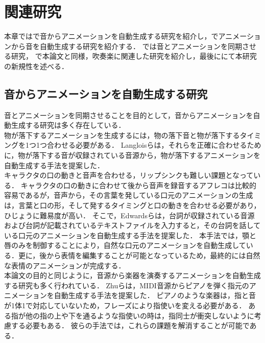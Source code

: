 \chapter{関連研究}
\label{chap:previousworks}
本章ではで音からアニメーションを自動生成する研究を紹介し，でアニメーションから音を自動生成する研究を紹介する．
では音とアニメーションを同期させる研究，
で本論文と同様，吹奏楽に関連した研究を紹介し，最後ににて本研究の新規性を述べる．

\section{音からアニメーションを自動生成する研究}\label{sec:generate_animation}
音とアニメーションを同期させることを目的として，音からアニメーションを自動生成する研究は多く存在している．\\
\indent
物が落下するアニメーションを生成するには，物の落下音と物が落下するタイミングを1つ1つ合わせる必要がある．
Langloisら\cite{IFA}は，それらを正確に合わせるために，物が落下する音が収録されている音源から，物が落下するアニメーションを自動生成する手法を提案した．\\
%
\indent
キャラクタの口の動きと音声を合わせる，リップシンクも難しい課題となっている．
キャラクタの口の動きに合わせて後から音声を録音するアフレコは比較的容易であるが，音声から，その言葉を発している口元のアニメーションの生成は，言葉と口の形，そして発するタイミングと口の動きを合わせる必要があり，ひじょうに難易度が高い．
そこで，Edwardsら\cite{JALI}は，台詞が収録されている音源および台詞が記載されているテキストファイルを入力すると，その台詞を話している口元のアニメーションを自動生成する手法を提案した．
本手法では，顎と唇のみを制御することにより，自然な口元のアニメーションを自動生成している．更に，後から表情を編集することが可能となっているため，最終的には自然な表情のアニメーションが完成する．\\
%
\indent
本論文の目的と同じように，音源から楽器を演奏するアニメーションを自動生成する研究も多く行われている．
Zhuら\cite{piano}は，MIDI音源からピアノを弾く指元のアニメーションを自動生成する手法を提案した．
ピアノのような楽器は，指と音が1体1で対応していないため，フレーズにより指使いを変える必要がある．
ある指が他の指の上や下を通るような指使いの時は，指同士が衝突しないように考慮する必要もある．
彼らの手法では，これらの課題を解消することが可能である．
%
